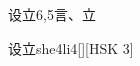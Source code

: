 \begin{entry}{设立}{6,5}{⾔、⽴}
  \begin{phonetics}{设立}{she4li4}[][HSK 3]
  \end{phonetics}
\end{entry}
